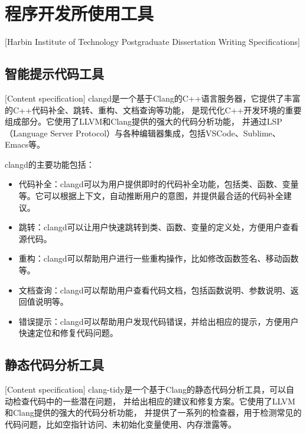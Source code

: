 

\chapter[程序开发使用工具]{程序开发所使用工具}[Harbin Institute of Technology Postgraduate Dissertation Writing Specifications]

\section{智能提示代码工具}[Content specification]
clangd是一个基于Clang的C++语言服务器，它提供了丰富的C++代码补全、跳转、重构、文档查询等功能，
是现代化C++开发环境的重要组成部分。它使用了LLVM和Clang提供的强大的代码分析功能，
并通过LSP（Language Server Protocol）与各种编辑器集成，包括VSCode、Sublime、Emacs等。

clangd的主要功能包括：

\begin{itemize}[itemindent=2em]
\item 代码补全：clangd可以为用户提供即时的代码补全功能，包括类、函数、变量等。它可以根据上下文，自动推断用户的意图，并提供最合适的代码补全建议。

\item 跳转：clangd可以让用户快速跳转到类、函数、变量的定义处，方便用户查看源代码。

\item 重构：clangd可以帮助用户进行一些重构操作，比如修改函数签名、移动函数等。

\item 文档查询：clangd可以帮助用户查看代码文档，包括函数说明、参数说明、返回值说明等。

\item 错误提示：clangd可以帮助用户发现代码错误，并给出相应的提示，方便用户快速定位和修复代码问题。
\end{itemize}


\section{静态代码分析工具}[Content specification]
clang-tidy是一个基于Clang的静态代码分析工具，可以自动检查代码中的一些潜在问题，
并给出相应的建议和修复方案。它使用了LLVM和Clang提供的强大的代码分析功能，
并提供了一系列的检查器，用于检测常见的代码问题，比如空指针访问、未初始化变量使用、内存泄露等。

